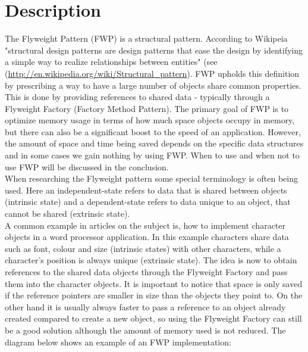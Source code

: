 \section{Description}
The Flyweight Pattern (FWP) is a structural pattern. According to Wikipeia "structural design patterns are design patterns that ease the design by identifying a simple way to realize relationships between entities" (see (\url{http://en.wikipedia.org/wiki/Structural_pattern}). FWP upholds this definition by prescribing a way to have a large number of objects share common properties. This is done by providing references to shared data - typically through a Flyweight Factory (Factory Method Pattern). The primary goal of FWP is to optimize memory usage in terms of how much space objects occupy in memory, but there can also be a significant boost to the speed of an application. However, the amount of space and time being saved depends on the specific data structures and in some cases we gain nothing by using FWP. When to use and when not to use FWP will be discussed in the conclusion.\\

When researching the Flyweight pattern some special terminology is often being used. Here an independent-state refers to data that is shared between objects (intrinsic state) and a dependent-state refers to data unique to an object, that cannot be shared (extrinsic state).\\

A common example in articles on the subject is, how to implement character objects in a word processor application. In this example characters share data such as font, colour and size (intrinsic states) with other characters, while a character's position is always unique (extrinsic state). The idea is now to obtain references to the shared data objects through the Flyweight Factory and pass them into the character objects. It is important to notice that space is only saved if the reference pointers are smaller in size than the objects they point to. On the other hand it is usually always faster to pass a reference to an object already created compared to create a new object, so using the Flyweight Factory can still be a good solution although the amount of memory used is not reduced. The diagram below shows an example of an FWP implementation:



 